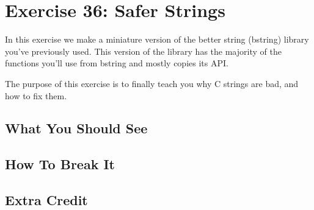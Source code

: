 \chapter{Exercise 36: Safer Strings}

In this exercise we make a miniature version of the better string (bstring) library 
you've previously used.  This version of the library has the majority of the 
functions you'll use from bstring and mostly copies its API.

The purpose of this exercise is to finally teach you why C strings are bad,
and how to fix them.

\section{What You Should See}


\section{How To Break It}


\section{Extra Credit}



